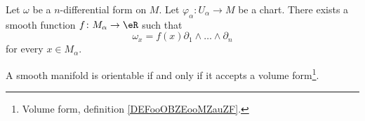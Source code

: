 \begin{lemma}		\label{LEMooQGVMooSHXUmD}
	Let \( \omega\) be a \( n\)-differential form on \( M\). Let \(\varphi_{\alpha} \colon U_{\alpha} \to M  \) be a chart. There exists a smooth function \(f \colon M_{\alpha}\to \eR   \) such that
	\begin{equation}
		\omega_x=f(x)\partial_1\wedge\ldots\wedge\partial_n
	\end{equation}
	for every \( x\in M_{\alpha}\).
\end{lemma}

\begin{theorem}	\label{THOooQEFUooQTtPDD}
	A smooth manifold is orientable if and only if it accepts a volume form\footnote{Volume form, definition \ref{DEFooOBZEooMZauZF}.}.
\end{theorem}

